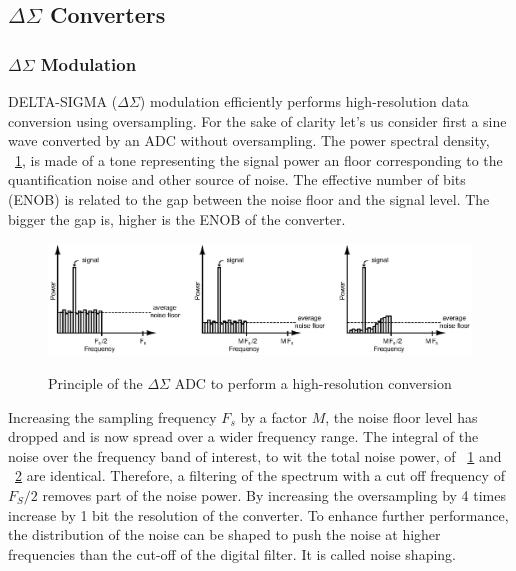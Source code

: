 \subsection{\(\Delta\Sigma \) Converters}      %
\label{sec:sd-isd-adc}
\subsubsection{\(\Delta\Sigma \) Modulation}
DELTA-SIGMA (\(\Delta\Sigma \)) modulation efficiently performs high-resolution data conversion using oversampling. For the sake of clarity let's us consider first a sine wave converted by an ADC without oversampling. The power spectral density, \figurename~\ref{fig:spectrum-sine-nyquist}, is made of a tone representing the signal power an floor corresponding to the quantification noise and other source of noise. The effective number of bits (ENOB) is related to the gap between the noise floor and the signal level. The bigger the gap is, higher is the ENOB of the converter.

\begin{figure}[htp]
    \centering
    \includegraphics[width=\textwidth]{Chapter2/Figs/Vector/sd-noise-shaping.ps}
    \begin{subfigure}[b]{0.33\textwidth}
        \label{fig:spectrum-sine-nyquist}
    \end{subfigure}
    \begin{subfigure}[b]{0.33\textwidth}
        \label{fig:spectrum-sine-oversampling}
    \end{subfigure}
    \begin{subfigure}[b]{0.33\textwidth}
    \end{subfigure}
    \caption{Principle of the $\Delta \Sigma$ ADC to perform a high-resolution conversion}
    \label{}
\end{figure}

Increasing the sampling frequency $F_s$ by a factor $M$, the noise floor level has dropped and is now spread over a wider frequency range. The integral of the noise over the frequency band of interest, to wit the total noise power, of \figurename~\ref{fig:spectrum-sine-nyquist} and \figurename~\ref{fig:spectrum-sine-oversampling} are identical. Therefore, a filtering of the spectrum with a cut off frequency of $F_S/2$ removes part of the noise power. By increasing the oversampling by 4 times increase by 1 bit the resolution of the converter. To enhance further performance, the distribution of the noise can be shaped to push the noise at higher frequencies than the cut-off of the digital filter. It is called noise shaping.

